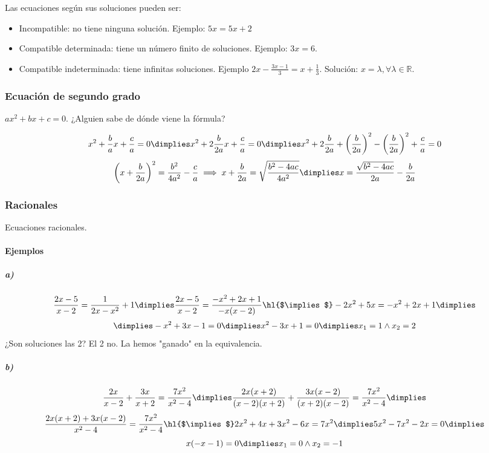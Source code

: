 Las ecuaciones según sus soluciones pueden ser:
\begin{itemize}
	\item Incompatible: no tiene ninguna solución. Ejemplo: $5x=5x+2$
	\item Compatible determinada: tiene un número finito de soluciones. Ejemplo: $3x=6$.
	\item Compatible indeterminada: tiene infinitas soluciones. Ejemplo $2x-\frac{3x-1}{3} = x+\frac{1}{3}$. Solución: $x=λ, ∀λ∈ℝ$.
\end{itemize}


\subsubsection{Ecuación de segundo grado}

$ax^2+bx+c=0$. ¿Alguien sabe de dónde viene la fórmula?

\[
	x^2+\frac{b}{a}x+\frac{c}{a}=0 \dimplies x^2+2\frac{b}{2a}x+\frac{c}{a}=0\dimplies x^2+2\frac{b}{2a}+\left(\frac{b}{2a}\right)^2-\left(\frac{b}{2a}\right)^2+\frac{c}{a} = 0
\]
\[
	\left(x+\frac{b}{2a}\right)^2 = \frac{b^2}{4a^2}-\frac{c}{a} \implies x+\frac{b}{2a} = \sqrt{\frac{b^2-4ac}{4a^2}} \dimplies x = \frac{\sqrt{b^2-4ac}}{2a} -\frac{b}{2a}
\]

\subsubsection{Racionales}

Ecuaciones racionales.

\paragraph{Ejemplos}
\subparagraph{a)}

\[
	\frac{2x-5}{x-2} = \frac{1}{2x-x^2}+1 \dimplies \frac{2x-5}{x-2} = \frac{-x^2+2x+1}{-x(x-2)} \text{\hl{$\implies$}} -2x^2+5x = -x^2+2x+1\dimplies \]
	\[ \dimplies -x^2+3x-1 = 0 \dimplies x^2-3x+1 = 0 \dimplies x_1=1\wedge x_2=2
\]
¿Son soluciones las 2? El 2 no. La hemos "ganado" en la equivalencia.

\subparagraph{b)}
\[
	\frac{2x}{x-2} + \frac{3x}{x+2} = \frac{7x^2}{x^2-4} \dimplies \frac{2x(x+2)}{(x-2)(x+2)} + \frac{3x(x-2)}{(x+2)(x-2)} = \frac{7x^2}{x^2-4} \dimplies 
\]
\[
	\frac{2x(x+2)+3x(x-2)}{x^2-4} = \frac{7x^2}{x^2-4} \text{\hl{$\implies$}} 2x^2+4x+3x^2-6x=7x^2 \dimplies 5x^2-7x^2-2x = 0 \dimplies 
\]
\[
	x(-x-1) = 0 \dimplies x_1 = 0 \wedge x_2 = -1
\]

